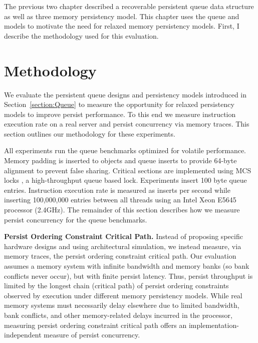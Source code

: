 The previous two chapter described a recoverable persistent queue data structure as well as three memory persistency model.
This chapter uses the queue and models to motivate the need for relaxed memory persistency models.
First, I describe the methodology used for this evaluation.

\section{Methodology}
\label{sec:PersistencyEval:Methodology}

We evaluate the persistent queue designs and persistency models introduced in Section~\ref{section:Queue} to measure the opportunity for relaxed persistency models to improve persist performance.
To this end we measure instruction execution rate on a real server and persist concurrency via memory traces.
This section outlines our methodology for these experiments.

All experiments run the queue benchmarks optimized for volatile performance.
Memory padding is inserted to objects and queue inserts to provide 64-byte alignment to prevent false sharing.
Critical sections are implemented using MCS locks \cite{Mellor-Crummey91}, a high-throughput queue based lock.
Experiments insert 100 byte queue entries.
Instruction execution rate is measured as inserts per second while inserting 100,000,000 entries between all threads using an Intel Xeon E5645 processor (2.4GHz).
The remainder of this section describes how we measure persist concurrency for the queue benchmarks.

\textbf{Persist Ordering Constraint Critical Path.}
Instead of proposing specific hardware designs and using architectural simulation, we instead measure, via memory traces, the persist ordering constraint critical path.
Our evaluation assumes a memory system with infinite bandwidth and memory banks (so bank conflicts never occur), but with finite persist latency.
Thus, persist throughput is limited by the longest chain (critical path) of persist ordering constraints observed by execution under different memory persistency models.
While real memory systems must necessarily delay elsewhere due to limited bandwidth, bank conflicts, and other memory-related delays incurred in the processor, measuring persist ordering constraint critical path offers an implementation-independent measure of persist concurrency.

